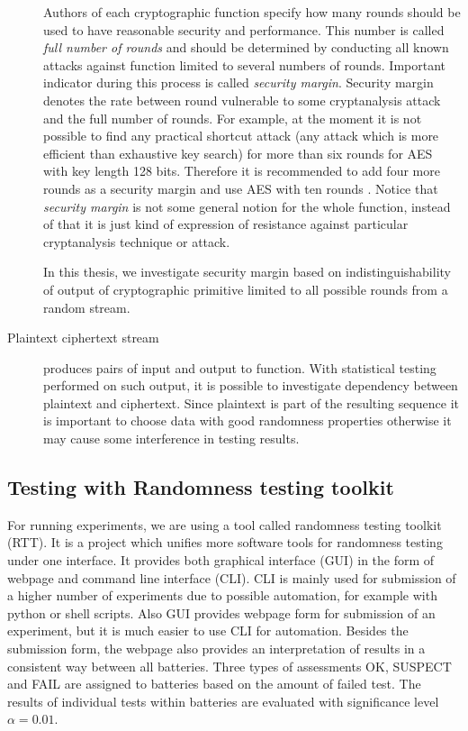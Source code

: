 \documentclass[
    digital,    %
    oneside,    %
    color,
    11pt,
    nocover,
    notable,
    nolof,
    nolot,
    final
]{fithesis3}
\renewcommand\_{\textunderscore\allowbreak}
\begin{document}
\begin{description}
	Authors of each cryptographic function specify how many rounds should be used to have reasonable security and performance. This number is called \textit{full number of rounds} and should be determined by conducting all known attacks against function limited to several numbers of rounds. Important indicator during this process is called \textit{security margin}. Security margin denotes the rate between round vulnerable to some cryptanalysis attack and the full number of rounds. For example, at the moment it is not possible to find any practical shortcut attack (any attack which is more efficient than exhaustive key search) for more than six rounds for AES with key length 128 bits. Therefore it is recommended to add four more rounds as a security margin and use AES with ten rounds \cite{daemen1999aes}. Notice that \textit{security margin} is not some general notion for the whole function, instead of that it is just kind of expression of resistance against particular cryptanalysis technique or attack.
	
	In this thesis, we investigate security margin based on indistinguishability of output of cryptographic primitive limited to all possible rounds from a random stream.
	
	\item[Plaintext ciphertext stream] produces pairs of input and output to function. With statistical testing performed on such output, it is possible to investigate dependency between plaintext and ciphertext. Since plaintext is part of the resulting sequence it is important to choose data with good randomness properties otherwise it may cause some interference in testing results.

\end{description}

\subsection{Testing with Randomness testing toolkit}

For running experiments, we are using a tool called randomness testing toolkit (RTT). It is a project which unifies more software tools for randomness testing under one interface. It provides both graphical interface (GUI) in the form of webpage and command line interface (CLI). CLI is mainly used for submission of a higher number of experiments due to possible automation, for example with python or shell scripts. Also GUI provides webpage form for submission of an experiment, but it is much easier to use CLI for automation. Besides the submission form, the webpage also provides an interpretation of results in a consistent way between all batteries. Three types of assessments OK, SUSPECT and FAIL are assigned to batteries based on the amount of failed test. The results of individual tests within batteries are evaluated with significance level $\alpha = 0.01$.
\end{document}
